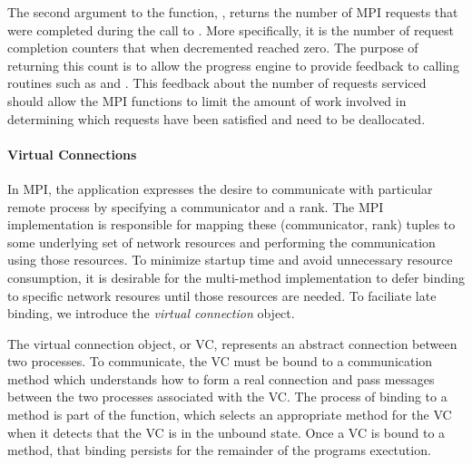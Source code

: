 The second argument to the  function, , returns
the number of MPI requests that were completed during the call to .
More specifically, it is the number of request completion counters that when
decremented reached zero.  The purpose of returning this count is to allow the
progress engine to provide feedback to calling routines such as 
and .  This feedback about the number of requests serviced
should allow the MPI functions to limit the amount of work involved in
determining which requests have been satisfied and need to be deallocated.

\paragraph{Virtual Connections}

% 
% 

In MPI, the application expresses the desire to communicate with particular
remote process by specifying a communicator and a rank.  The MPI implementation
is responsible for mapping these (communicator, rank) tuples to some underlying
set of network resources and performing the communication using those
resources.  To minimize startup time and avoid unnecessary resource
consumption, it is desirable for the multi-method implementation to defer
binding to specific network resoures until those resources are needed.  To
faciliate late binding, we introduce the \emph{virtual connection} object.

The virtual connection object, or VC, represents an abstract connection between
two processes.  To communicate, the VC must be bound to a communication method
which understands how to form a real connection and pass messages between the
two processes associated with the VC.  The process of binding to a method is
part of the  function, which selects an
appropriate method for the VC when it detects that the VC is in the unbound
state.  Once a VC is bound to a method, that binding persists for the remainder
of the programs exectution.

